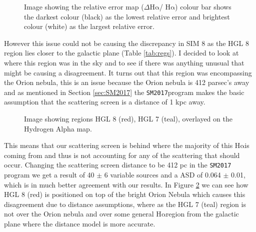 \documentclass[a4paper]{article}
\def\halpha{$\mathrm{H\alpha}$\;}
\def\sm{\texttt{SM2017}}
\begin{document}
\begin{figure}[H]
\begin{center}
  \caption{Image showing the relative error map ($\Delta$\halpha/ \halpha) colour bar shows the darkest colour (black) as the lowest relative error and brightest colour (white) as the largest relative error.}
  \label{fig:comp}
\end{center}
\end{figure}
However this issue could not be causing the discrepancy in SIM 8 as the HGL 8 region lies closer to the galactic plane (Table \ref{tab:regs}). I decided to look at where this region was in the sky and to see if there was anything unusual that might be causing a disagreement. It turns out that this region was encompassing the Orion nebula, this is an issue because the Orion nebula is 412 parsec's away and as mentioned in Section \ref{sec:SM2017} the \sm program makes the basic assumption that the scattering screen is a distance of 1 kpc away.
\begin{figure}
  \vspace{-20pt}
  \begin{center}
  \end{center}
  \vspace{-20pt}
  \caption{Image showing regions HGL 8 (red), HGL 7 (teal), overlayed on the Hydrogen Alpha map.}
  \label{fig:HAreg}
  \vspace{-10pt}
\end{figure}
This means that our scattering screen is behind where the majority of this \halpha is coming from and thus is not accounting for any of the scattering that should occur. Changing the scattering screen distance to be 412 pc in the \texttt{SM2017} program we get a result of 40 $\pm$ 6 variable sources and a ASD of 0.064 $\pm$ 0.01, which is in much better agreement with our results. In Figure \ref{fig:HAreg} we can see how HGL 8 (red) is positioned on top of the bright Orion Nebula which causes this disagreement due to distance assumptions, where as the HGL 7 (teal) region is not over the Orion nebula and over some general \halpha region from the galactic plane where the distance model is more accurate.
\end{document}
